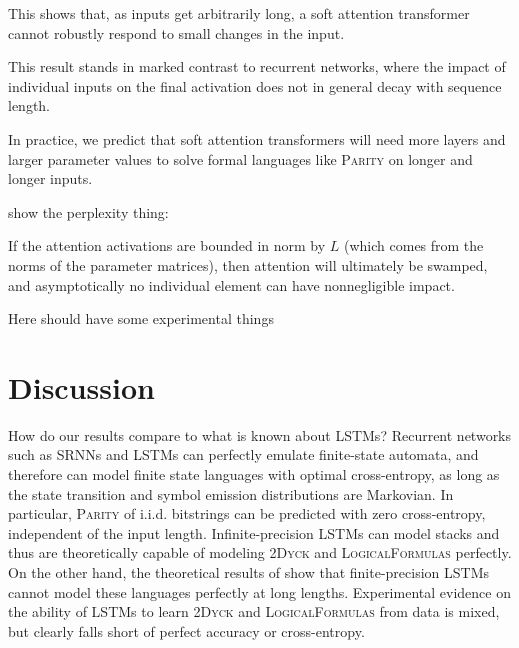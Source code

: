 \documentclass[11pt,a4paper]{article}
\begin{document}
This shows that, as inputs get arbitrarily long, a soft attention transformer cannot robustly respond to small changes in the input.




This result stands in marked contrast to recurrent networks, where the impact of individual inputs on the final activation does not in general decay with sequence length.

In practice, we predict that soft attention transformers will need more layers and larger parameter values to solve formal languages like \textsc{Parity} on longer and longer inputs.





show the perplexity thing:

If the attention activations are bounded in norm by $L$ (which comes from the norms of the parameter matrices), then attention will ultimately be swamped, and asymptotically no individual element can have nonnegligible impact.

Here should have some experimental things





\section{Discussion}

How do our results compare to what is known about LSTMs?
Recurrent networks such as SRNNs and LSTMs can perfectly emulate finite-state automata, and therefore can model finite state languages with optimal cross-entropy, as long as the state transition and symbol emission distributions are Markovian.
In particular, \textsc{Parity} of i.i.d. bitstrings can be predicted with zero cross-entropy, independent of the input length.
Infinite-precision LSTMs can model stacks \cite{kirov2012processing} and thus are theoretically capable of modeling \textsc{2Dyck} and \textsc{LogicalFormulas} perfectly.
On the other hand, the theoretical results of \cite{merrill2019sequential} show that finite-precision LSTMs cannot model these languages perfectly at long lengths.
Experimental evidence on the ability of LSTMs to learn \textsc{2Dyck} and \textsc{LogicalFormulas} from data is mixed, but clearly falls short of perfect accuracy or cross-entropy.
\end{document}
